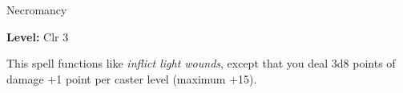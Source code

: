 
Necromancy

\textbf{Level:} Clr 3

This spell functions like \textit{inflict light wounds}, except that you deal 3d8 
points of damage +1 point per caster level (maximum +15).

